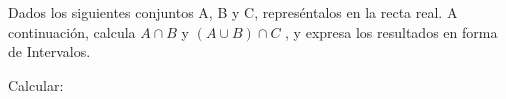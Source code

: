 \documentclass[addpoints,spanish, 12pt,a4paper]{exam}
\begin{document}
        \begin{questions}
        \question Dados los siguientes conjuntos A, B y C, represéntalos en la recta real. A continuación, calcula $A \cap B$ y $(A \cup B) \cap C$ , 
y expresa los resultados en forma de Intervalos. 
        \begin{multicols}{1} 
        \begin{parts} \part[1]  $ A=\left\{ x \in \mathbb{R}| \left|{x - 3}\right|>0 \right\} \\ B=\left(-\infty, -3\right) \cup \left(-3, 3\right] \\  C=\left\{ x \in \mathbb{R}| \left|{x - 3}\right|\leq12 \right\} \\ $  \begin{solution}  $ A=\left(-\infty, 3\right) \cup \left(3, \infty\right) \ C=\left[-9, 15\right] \   \\  A \cap B= \left(-\infty, -3\right) \cup \left(-3, 3\right)   \\  (A \cup B) \cap C= \left[-9, 15\right] $  \end{solution}
        \end{parts}
        \end{multicols}
        \question Calcular:
        \begin{multicols}{1} 
        \begin{parts} 

\end{parts}
\end{multicols}
\end{questions}
\end{document}
